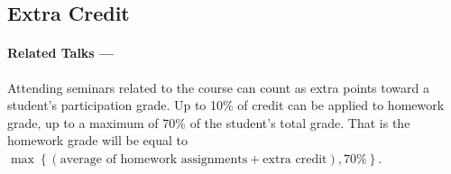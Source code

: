 \documentclass[12pt]{scrartcl}
\begin{document}
%

\subsection{Extra Credit}
%

\paragraph{Related Talks ---} Attending seminars related to the course can count as extra points toward a student's participation grade. 
Up to 10\% of credit can be applied to homework grade, up to a maximum of 70\% of the student's total grade.
That is the homework grade will be equal to $\displaystyle\max\left\{\left(\textrm{average of homework assignments} + \textrm{extra credit} \right),70\%\right\}$.
\end{document}
